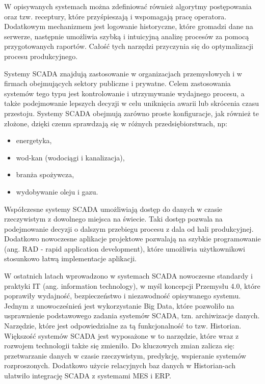 W opisywanych systemach można zdefiniować również algorytmy postępowania oraz tzw. receptury, które przyśpieszają i wspomagają pracę operatora. Dodatkowym mechanizmem jest logowanie historyczne, które gromadzi dane na serwerze, następnie umożliwia szybką i intuicyjną analizę procesów za pomocą przygotowanych raportów. Całość tych narzędzi przyczynia się do optymalizacji procesu produkcyjnego.  



Systemy SCADA znajdują zastosowanie w organizacjach przemysłowych i w firmach obejmujących sektory publiczne i prywatne. Celem zastosowania systemów tego typu jest kontrolowanie i utrzymywanie wydajnego procesu, a także podejmowanie lepszych decyzji w celu uniknięcia awarii lub skrócenia czasu przestoju. Systemy SCADA obejmują zarówno proste konfiguracje, jak również te złożone, dzięki czemu sprawdzają się w różnych przedsiębiorstwach, np:

\begin{itemize}
	\item energetyka,
	\item wod-kan (wodociągi i kanalizacja),
	\item branża spożywcza,
	\item wydobywanie oleju i gazu. 
\end{itemize}





Współczesne systemy SCADA umożliwiają dostęp do danych w czasie rzeczywistym z dowolnego miejsca na świecie. Taki dostęp pozwala na podejmowanie decyzji o dalszym przebiegu procesu z dala od hali produkcyjnej. Dodatkowo nowoczesne aplikacje projektowe pozwalają na szybkie programowanie (ang. RAD - rapid application development), które umożliwia użytkownikowi stosunkowo łatwą implementacje aplikacji.


W ostatnich latach wprowadzono w systemach SCADA nowoczesne standardy i praktyki IT (ang. information technology), w myśl koncepcji Przemysłu 4.0, które poprawiły wydajność, bezpieczeństwo i niezawodność opisywanego systemu. Jednym z unowocześnień jest wykorzystanie Big Data, które pozwoliło na usprawnienie podstawowego zadania systemów SCADA, tzn. archiwizacje danych. Narzędzie, które jest odpowiedzialne za tą funkcjonalność to tzw. Historian. Większość systemów SCADA jest wyposażone w to narzędzie, które wraz z rozwojem technologii także się zmieniło. Do kluczowych zmian zalicza się: przetwarzanie danych w czasie rzeczywistym, predykcję, wspieranie systemów rozproszonych. Dodatkowo użycie relacyjnych baz danych w Historian-ach ułatwiło integrację SCADA z systemami MES i ERP. 

